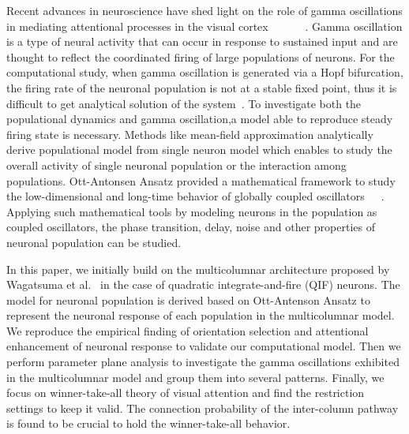 \documentclass[10pt,letterpaper]{article}
\begin{document}
Recent advances in neuroscience have shed light on the role of gamma oscillations in mediating attentional processes in the visual cortex ~\cite{fries2009}~\cite{tiesinga2009}~\cite{ardid2010}~\cite{goddard2012}~\cite{bosman2012}~\cite{magazzini2018}. Gamma oscillation is a type of neural activity that can occur in response to sustained input and are thought to reflect the coordinated firing of large populations of neurons. For the computational study, when gamma oscillation is generated via a Hopf bifurcation, the firing rate of the neuronal population is not at a stable fixed point, thus it is difficult to get analytical solution of the system~\cite{kotani2014}. To investigate both the populational dynamics and gamma oscillation,a model able to reproduce steady firing state is necessary. Methods like mean-field approximation analytically derive populational model from single neuron model which enables to study the overall activity of single neuronal population or the interaction among populations. Ott-Antonsen Ansatz provided a mathematical framework to study the low-dimensional and long-time behavior of globally coupled oscillators~\cite{ott2008}~\cite{ott2009}~\cite{montbrio2015}. Applying such mathematical tools by modeling neurons in the population as coupled oscillators, the phase transition, delay, noise and other properties of neuronal population can be studied. 

In this paper, we initially build on the multicolumnar architecture proposed by Wagatsuma et al.~\cite{wagatsuma2011} in the case of quadratic integrate-and-fire (QIF) neurons. The model for neuronal population is derived based on Ott-Antenson Ansatz to represent the neuronal response of each population in the multicolumnar model. We reproduce the empirical finding of orientation selection and attentional enhancement of neuronal response to validate our computational model. Then we perform parameter plane analysis to investigate the gamma oscillations exhibited in the multicolumnar model and group them into several patterns. Finally, we focus on winner-take-all theory of visual attention and find the restriction settings to keep it valid. The connection probability of the inter-column pathway is found to be crucial to hold the winner-take-all behavior.
\end{document}
